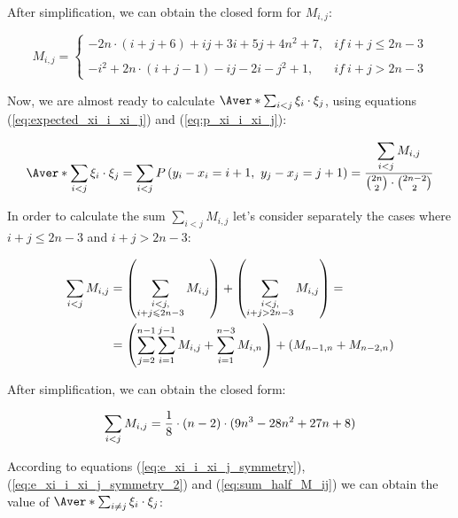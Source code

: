 \documentclass{article}
\begin{document}
After simplification, we can obtain the closed form for $M_{i,j}$:

\begin{equation} \label{eq:m_ij}
	M_{i,j} = 
	\begin{cases}
		-2n \cdot (i + j + 6) + ij + 3i + 5j + 4n^2 + 7, & if\ i + j \leqslant 2n - 3 \\
		\\
		-i^2 + 2n \cdot (i + j - 1) - ij - 2i - j^2 + 1 , & if\ i + j > 2n - 3
	\end{cases}
\end{equation}

Now, we are almost ready to calculate $\Aver*{\sum_{i < j}\xi_i \cdot \xi_j}$, using equations (\ref{eq:expected_xi_i_xi_j}) and (\ref{eq:p_xi_i_xi_j}): 

\begin{equation} \label{eq:e_xi_i_xi_j_symmetry_2}
	\Aver*{\sum_{i < j}\xi_i \cdot \xi_j} = \sum_{i < j} P\left( y_i - x_i = i + 1,\   y_j - x_j = j + 1 \right) = {\displaystyle\sum_{i < j}M_{i,j} \over {2n \choose 2} \cdot {2n - 2 \choose 2}}
\end{equation} 

In order to calculate the sum $\sum_{i < j}M_{i,j}$ let's consider separately the cases where $i + j \leqslant 2n - 3$ and $i + j > 2n - 3$:

\begin{equation} \label{eq:sum_half_M_ij}
\begin{split}
	\sum_{i < j}M_{i,j} & = \left(\smashoperator\sum_{\substack{i < j, \\ i + j \leqslant 2n - 3}}M_{i,j}\right) + \left(\smashoperator\sum_{\substack{i < j, \\ i + j > 2n - 3}}M_{i,j}\right) = \\
				   & = \left(\sum_{j=2}^{n-1}\sum_{i = 1}^{j-1} M_{i,j} + \sum_{i = 1}^{n-3} M_{i,n} \right) + \left( M_{n-1,n} + M_{n-2,n} \right)
\end{split}
\end{equation} 

After simplification, we can obtain the closed form:

\begin{equation}
	\sum_{i < j}M_{i,j} = {1 \over 8} \cdot (n-2) \cdot (9n^3 - 28n^2 + 27n + 8)
\end{equation}

According to equations (\ref{eq:e_xi_i_xi_j_symmetry}), (\ref{eq:e_xi_i_xi_j_symmetry_2}) and (\ref{eq:sum_half_M_ij}) we can obtain the value of $\Aver*{\sum_{i \neq j}\xi_i \cdot \xi_j}$:
\end{document}
